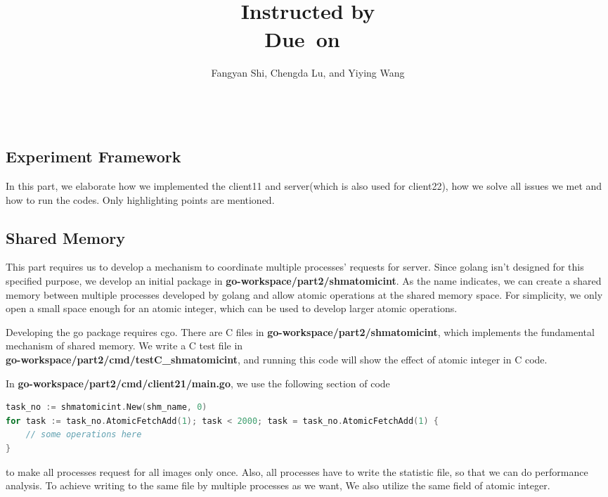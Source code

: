 \documentclass{article}
\title{\textmd{\bf \Title}\\{\large Instructed by \textit{\ClassInstructor}}\\\normalsize\vspace{0.1in}\small{Due\ on\ \DueDate}}
\date{}
\author{%
Fangyan Shi\affmark[1], Chengda Lu\affmark[2], and Yiying Wang\affmark[3]\\
\affaddr{\affmark[1]2021010892 \affmark[2]2021010899 \affmark[3]2020011604}\\
\email{\{\affmark[1]sfy21,\affmark[2]lucd21,\affmark[3]wangyiyi20\}@mails.tsinghua.edu.cn}\\
}
\begin{document}
\begin{spacing}{1.1}
\maketitle \thispagestyle{empty}

\newcommand{\FIGDIR}{} %

\section{Experiment Framework}

In this part, we elaborate how we implemented the client11 and server(which is also used for client22), how we solve all issues we met and how to run the codes. Only highlighting points are mentioned.

\subsection{Shared Memory}

This part requires us to develop a mechanism to coordinate multiple processes' requests for server. Since golang isn't designed for this specified purpose, we develop an initial package in \textbf{go-workspace/part2/shmatomicint}. As the name indicates, we can create a shared memory between multiple processes developed by golang and allow atomic operations at the shared memory space. For simplicity, we only open a small space enough for an atomic integer, which can be used to develop larger atomic operations. 

Developing the go package requires cgo. There are C files in \textbf{go-workspace/part2/shmatomicint}, which implements the fundamental mechanism of shared memory. We write a C test file in \\ \textbf{go-workspace/part2/cmd/testC\_shmatomicint}, and running this code will show the effect of atomic integer in C code.

In \textbf{go-workspace/part2/cmd/client21/main.go}, we use the following section of code
\begin{lstlisting}[language=Go]
task_no := shmatomicint.New(shm_name, 0)
for task := task_no.AtomicFetchAdd(1); task < 2000; task = task_no.AtomicFetchAdd(1) {
    // some operations here
}
\end{lstlisting}
to make all processes request for all images only once. Also, all processes have to write the statistic file, so that we can do performance analysis. To achieve writing to the same file by multiple processes as we want, We also utilize the same field of atomic integer.


\end{spacing}
\end{document}
